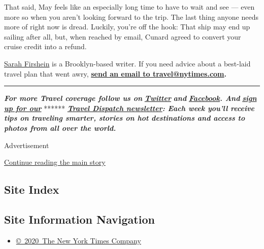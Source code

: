 That said, May feels like an especially long time to have to wait and
see --- even more so when you aren't looking forward to the trip. The
last thing anyone needs more of right now is dread. Luckily, you're off
the hook: That ship may end up sailing after all, but, when reached by
email, Cunard agreed to convert your cruise credit into a refund.

\href{https://twitter.com/sfirshein?lang=en}{Sarah Firshein} is a
Brooklyn-based writer. If you need advice about a best-laid travel plan
that went awry, \textbf{\href{mailto:travel@nytimes.com}{send an email
to travel@nytimes.com}.}

\begin{center}\rule{0.5\linewidth}{\linethickness}\end{center}

\emph{\textbf{For more Travel coverage follow us on}}
\textbf{\href{https://twitter.com/nytimestravel}{\emph{Twitter}}}
\emph{\textbf{and}}
\textbf{\href{https://www.facebook.com/nytimestravel/}{\emph{Facebook}}\emph{.
And}}
\textbf{\href{https://www.nytimes.com/newsletters/traveldispatch?action=click\&module=inline\&pgtype=Article}{\emph{sign
up for our}}} ******
\textbf{\href{https://www.nytimes.com/newsletters/traveldispatch}{\emph{Travel
Dispatch newsletter}}\emph{: Each week you'll receive tips on traveling
smarter, stories on hot destinations and access to photos from all over
the world.}}

Advertisement

\protect\hyperlink{after-bottom}{Continue reading the main story}

\hypertarget{site-index}{%
\subsection{Site Index}\label{site-index}}

\hypertarget{site-information-navigation}{%
\subsection{Site Information
Navigation}\label{site-information-navigation}}

\begin{itemize}
\tightlist
\item
  \href{https://help.nytimes.com/hc/en-us/articles/115014792127-Copyright-notice}{©~2020~The
  New York Times Company}
\end{itemize}

